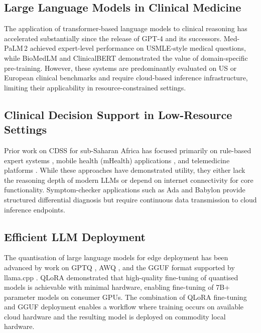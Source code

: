 \documentclass[journal]{IEEEtran}
\begin{document}
\subsection{Large Language Models in Clinical Medicine}

The application of transformer-based language models to clinical
reasoning has accelerated substantially since the release of
GPT-4 \cite{openai2023gpt4} and its successors. Med-PaLM\,2
\cite{singhal2023medpalm2} achieved expert-level performance on
USMLE-style medical questions, while BioMedLM \cite{bolton2022biomedlm}
and ClinicalBERT \cite{huang2019clinicalbert} demonstrated the value
of domain-specific pre-training. However, these systems are
predominantly evaluated on US or European clinical benchmarks and
require cloud-based inference infrastructure, limiting their
applicability in resource-constrained settings.

\subsection{Clinical Decision Support in Low-Resource Settings}

Prior work on CDSS for sub-Saharan Africa has focused primarily on
rule-based expert systems \cite{fraser2007clinician}, mobile health
(mHealth) applications \cite{labrique2013mhealth}, and telemedicine
platforms \cite{bastawrous2015ehealth}. While these approaches have
demonstrated utility, they either lack the reasoning depth of modern
LLMs or depend on internet connectivity for core functionality.
Symptom-checker applications such as Ada \cite{ada2020} and Babylon
\cite{babylon2020} provide structured differential diagnosis but
require continuous data transmission to cloud inference endpoints.

\subsection{Efficient LLM Deployment}

The quantisation of large language models for edge deployment has
been advanced by work on GPTQ \cite{frantar2022gptq},
AWQ \cite{lin2023awq}, and the GGUF format supported by
llama.cpp \cite{gerganov2023llamacpp}. QLoRA \cite{dettmers2023qlora}
demonstrated that high-quality fine-tuning of quantised models is
achievable with minimal hardware, enabling fine-tuning of 7B+
parameter models on consumer GPUs. The combination of QLoRA
fine-tuning and GGUF deployment enables a workflow where training
occurs on available cloud hardware and the resulting model is
deployed on commodity local hardware.
\end{document}
